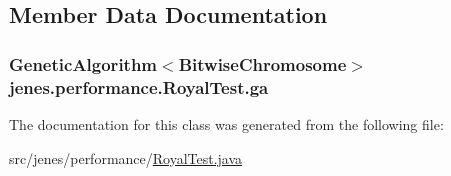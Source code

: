 \subsection{Member Data Documentation}
\hypertarget{classjenes_1_1performance_1_1_royal_test_a1b996f1c7dd63921753d3e5d70261eb5}{
\subsubsection[{ga}]{\setlength{\rightskip}{0pt plus 5cm}Genetic\-Algorithm$<${\bf Bitwise\-Chromosome}$>$ jenes.\-performance.\-Royal\-Test.\-ga\hspace{0.3cm}{\ttfamily [protected]}}}\label{classjenes_1_1performance_1_1_royal_test_a1b996f1c7dd63921753d3e5d70261eb5}


The documentation for this class was generated from the following file\-:\begin{DoxyCompactItemize}
\item 
src/jenes/performance/\hyperlink{_royal_test_8java}{Royal\-Test.\-java}\end{DoxyCompactItemize}
